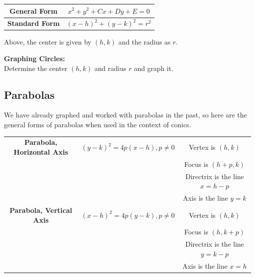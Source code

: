         \begin{center}
            \begin{tabular} {|c|c|}
                \hline
                \textbf{General Form}
                & $x^2+y^2+Cx+Dy+E=0$   \\
                \hline
                \textbf{Standard Form}
                & $(x-h)^2+(y-k)^2=r^2$ \\
                \hline
            \end{tabular}
        \end{center}

        \noindent Above, the center is given by $(h,k)$ and the radius as $r$.

        \noindent \color{purple} \textbf{Graphing Circles:} \color{black} \\
        Determine the center $(h,k)$ and radius $r$ and graph it.



    \subsection{Parabolas}
        We have already graphed and worked with parabolas in the past, so here are the general
        forms of parabolas when used in the context of conics. \\

        \begin{center}
            \begin{tabular} {|c|c|c|}
                \hline
                \textbf{Parabola, Horizontal Axis}
                & $(y-k)^2=4p(x-h),p\not=0$
                & Vertex is $(h,k)$ \\
                & & Focus is $(h+p,k)$            \\
                & & Directrix is the line $x=h-p$ \\
                & & Axis is the line $y=k$        \\
                \hline
                \textbf{Parabola, Vertical Axis}
                & $(x-h)^2=4p(y-k),p\not=0$
                & Vertex is $(h,k)$ \\
                & & Focus is $(h,k+p)$            \\
                & & Directrix is the line $y=k-p$ \\
                & & Axis is the line $x=h$        \\
                \hline
            \end{tabular}
        \end{center}



